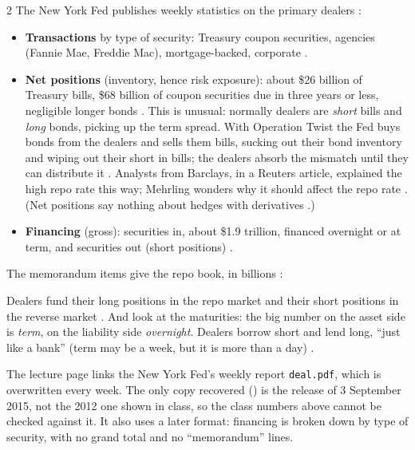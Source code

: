 \begin{paracol}{2}
The New York Fed publishes weekly statistics on the primary dealers :
\begin{itemize}
  \item \textbf{Transactions} by type of security: Treasury coupon securities, agencies (Fannie Mae, Freddie Mac), mortgage-backed, corporate
        .
  \item \textbf{Net positions} (inventory, hence risk exposure): about \$26 billion of Treasury bills, \$68 billion of coupon securities due in three years or
        less, negligible longer bonds . This is unusual: normally dealers are \emph{short} bills and \emph{long} bonds, picking up the term
        spread. With Operation Twist the Fed buys bonds from the dealers and sells them bills, sucking out their bond inventory and wiping out their short in
        bills; the dealers absorb the mismatch until they can distribute it . Analysts from
        Barclays, in a Reuters article, explained the high repo rate this way; Mehrling wonders why it should affect the repo rate .
        (Net positions say nothing about hedges with derivatives .)
  \item \textbf{Financing} (gross): securities in, about \$1.9 trillion, financed overnight or at term, and securities out (short positions)
        .
\end{itemize}
The memorandum items give the repo book, in billions :
\begin{taccts}
\end{taccts}
Dealers fund their long positions in the repo market and their short positions in the reverse market . And look at the maturities: the big number
on the asset side is \emph{term}, on the liability side \emph{overnight}. Dealers borrow short and lend long, ``just like a bank'' (term may be a week, but it is
more than a day) .

\begin{coursenote}
The lecture page links the New York Fed's weekly report \texttt{deal.pdf}, which is overwritten every week. The only copy recovered () is the release of 3 September 2015, not the 2012 one shown in class, so the class numbers above cannot be checked against it. It also uses a later format: financing is broken down by type of security, with no grand total and no ``memorandum'' lines.


\end{coursenote}
\end{paracol}
